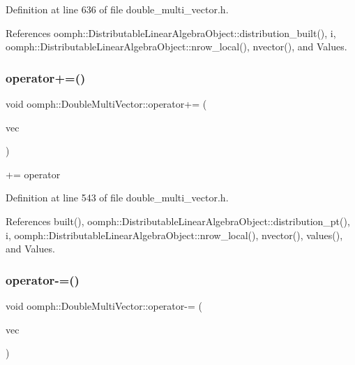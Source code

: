 Definition at line 636 of file double\+\_\+multi\+\_\+vector.\+h.



References oomph\+::\+Distributable\+Linear\+Algebra\+Object\+::distribution\+\_\+built(), i, oomph\+::\+Distributable\+Linear\+Algebra\+Object\+::nrow\+\_\+local(), nvector(), and Values.

\mbox{\label{classoomph_1_1DoubleMultiVector_ac5dad0557a1a0a62a4155aa6809de948}} 
\subsubsection{\texorpdfstring{operator+=()}{operator+=()}}
{\footnotesize\ttfamily void oomph\+::\+Double\+Multi\+Vector\+::operator+= (\begin{DoxyParamCaption}\item[{\hyperlink{classoomph_1_1DoubleMultiVector}{Double\+Multi\+Vector}}]{vec }\end{DoxyParamCaption})\hspace{0.3cm}{\ttfamily [inline]}}



+= operator 



Definition at line 543 of file double\+\_\+multi\+\_\+vector.\+h.



References built(), oomph\+::\+Distributable\+Linear\+Algebra\+Object\+::distribution\+\_\+pt(), i, oomph\+::\+Distributable\+Linear\+Algebra\+Object\+::nrow\+\_\+local(), nvector(), values(), and Values.

\mbox{\label{classoomph_1_1DoubleMultiVector_ab9d6d470f442410ee4df68e008d5ec7f}} 
\subsubsection{\texorpdfstring{operator-\/=()}{operator-=()}}
{\footnotesize\ttfamily void oomph\+::\+Double\+Multi\+Vector\+::operator-\/= (\begin{DoxyParamCaption}\item[{\hyperlink{classoomph_1_1DoubleMultiVector}{Double\+Multi\+Vector}}]{vec }\end{DoxyParamCaption})\hspace{0.3cm}{\ttfamily [inline]}}



